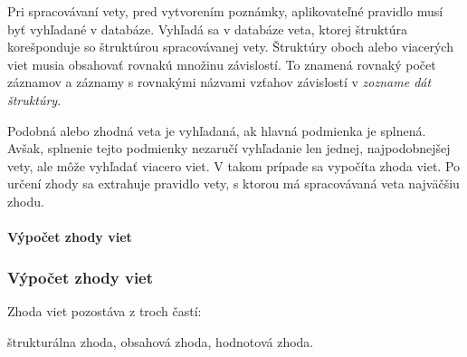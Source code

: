 \label{subsubsection:rule_lookup}
Pri spracovávaní vety, pred vytvorením poznámky, aplikovateľné pravidlo musí byť vyhľadané v databáze. Vyhľadá sa v databáze veta, ktorej štruktúra korešponduje so štruktúrou spracovávanej vety. Štruktúry oboch alebo viacerých viet musia obsahovať rovnakú množinu závislostí. To znamená rovnaký počet záznamov a záznamy s rovnakými názvami vzťahov závislostí v \textit{zozname dát štruktúry}.

Podobná alebo zhodná veta je vyhľadaná, ak hlavná podmienka je splnená. Avšak, splnenie tejto podmienky nezaručí vyhľadanie len jednej, najpodobnejšej vety, ale môže vyhľadať viacero viet. V takom prípade sa vypočíta zhoda viet. Po určení zhody sa extrahuje pravidlo vety, s ktorou má spracovávaná veta najväčšiu zhodu.

%
%
{
	\paragraph{Výpočet zhody viet}
}
{
	\subsubsection{Výpočet zhody viet}
}
\label{paragraph:sentences_match}

Zhoda viet pozostáva z troch častí:
\begin{my_itemize}
	\myitem štrukturálna zhoda,
	\myitem obsahová zhoda,
	\myitem hodnotová zhoda.
\end{my_itemize}

